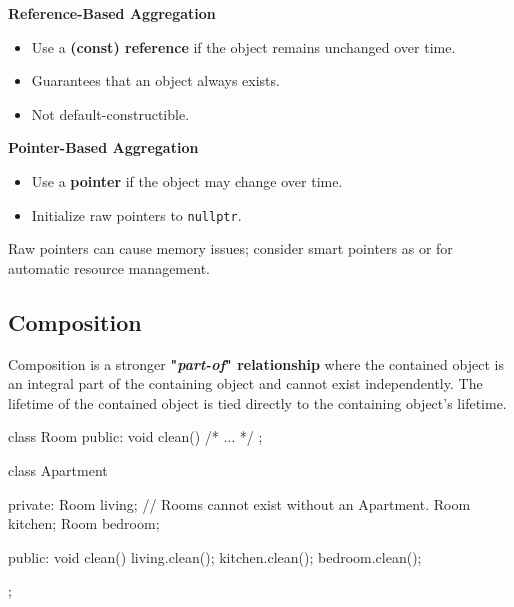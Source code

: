 \begin{minipage}[H]{0.48\textwidth}
    \textbf{Reference-Based Aggregation}
    \begin{itemize}
        \item Use a \textbf{(const) reference} if the object remains unchanged over time.
        \item Guarantees that an object always exists.
        \item Not default-constructible.
    \end{itemize}
\end{minipage}%
\hfill
\begin{minipage}[H]{0.48\textwidth}
    \textbf{Pointer-Based Aggregation}
    \begin{itemize}
        \item Use a \textbf{pointer} if the object may change over time.
        \item Initialize raw pointers to \texttt{nullptr}.
    \end{itemize}
\end{minipage}

\begin{observationblock}
    Raw pointers can cause memory issues; consider smart pointers as  or  for automatic resource management.
\end{observationblock}

\subsection{Composition}

Composition is a stronger \textbf{"\textit{part-of}" relationship} where the contained object is an integral part of the containing object and cannot exist independently. The lifetime of the contained object is tied directly to the containing object's lifetime.

\vspace{-0.5em}

\begin{codeblock}[language=C++, numbers=none]
class Room {
public:
    void clean() { /* ... */ }
};

class Apartment {
private:
    Room living;  // Rooms cannot exist without an Apartment.
    Room kitchen;
    Room bedroom;

public:
    void clean() { 
        living.clean(); 
        kitchen.clean(); 
        bedroom.clean(); 
    }
};
\end{codeblock}

